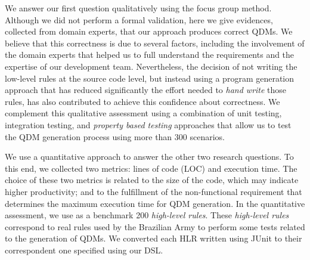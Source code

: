\documentclass[twocolumn]{bmcart}%
\newcommand{\callers}{\emph{high-level rules}\xspace}
\newcommand{\shc}{HLR\xspace}
\begin{document}
We answer our first question qualitatively using the focus group method. Although
we did not perform a formal validation, here we give evidences, collected from domain experts, that our approach produces correct QDMs. We believe that this correctness is due to several factors, including the involvement of the domain experts that helped us to full understand the requirements and the expertise of our development team. Nevertheless, the decision of not writing the low-level rules at the source code level, but instead using a program generation approach that has reduced significantly the effort needed to \emph{hand write} those rules, has also contributed to achieve this confidence about correctness. We complement this qualitative
assessment using a combination of unit testing, integration testing, and
\emph{property based testing} approaches that allow us to
test the QDM generation process using more than 300 scenarios. 

We use a quantitative approach to answer the other two research questions.
To this end, we collected two metrics: lines of code (LOC) and execution time. The choice of these two metrics is related to the size of the code, which may indicate higher productivity; and to the fulfillment of the non-functional requirement that determines the maximum execution time for QDM generation. In the quantitative assessment, we use as a benchmark 200 \callers. These \callers correspond to real rules used by the Brazilian Army to perform some tests related to the generation of QDMs. We converted each \shc written using JUnit to their correspondent one specified using our DSL.


\end{document}
